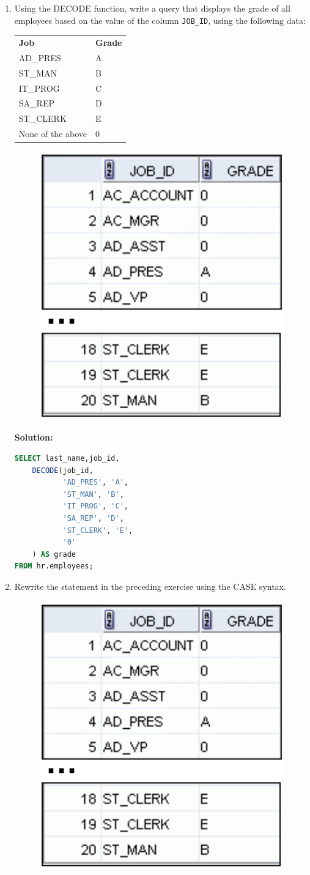 \documentclass[a4paper,12pt]{article}
\begin{document}
\begin{enumerate}
    \textbf{Solution: }
    \begin{lstlisting}[language=SQL]
SELECT last_name,
    CASE 
        WHEN commission_pct IS NULL OR commission_pct = 0 
        THEN 'No Commission'
        ELSE TO_CHAR(commission_pct,'fm.99')
    END AS comm
FROM 
    hr.employees;
    \end{lstlisting}
        \item Using the DECODE function, write a query that displays the grade of all employees based on the
value of the column \texttt{JOB\_ID}, using the following data:
 
\begin{tabularx}{\textwidth}{lX}
\textbf{Job} & \textbf{Grade} \\
AD\_PRES & A \\
ST\_MAN & B \\
IT\_PROG & C \\
SA\_REP & D \\
ST\_CLERK & E \\
None of the above & 0 \\
\end{tabularx}
    
    \begin{figure}[h]
        \centering
            \centering
            \includegraphics[width=.3\linewidth]{graphics/45.png}
    \end{figure}

    \textbf{Solution: }
    \begin{lstlisting}[language=SQL]
SELECT last_name,job_id,
    DECODE(job_id,
           'AD_PRES', 'A',
           'ST_MAN', 'B',
           'IT_PROG', 'C',
           'SA_REP', 'D',
           'ST_CLERK', 'E',
           '0'
    ) AS grade
FROM hr.employees;
    \end{lstlisting}
    \item Rewrite the statement in the preceding exercise using the CASE syntax.
    \begin{figure}[h]
        \centering
            \centering
            \includegraphics[width=.3\linewidth]{graphics/46.png}
    \end{figure}
    

\end{enumerate}
\end{document}

